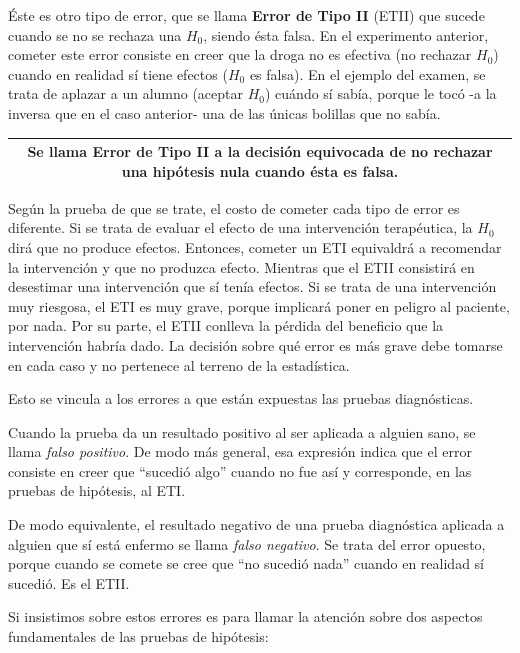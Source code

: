 \documentclass[]{book}
\begin{document}
Éste es otro tipo de error, que se llama \textbf{Error de Tipo II} (ETII) que
sucede cuando se no se rechaza una \(H_{0}\), siendo ésta falsa. En el experimento
anterior, cometer este error consiste en creer que la droga no es
efectiva (no rechazar \(H_{0}\)) cuando en realidad sí tiene efectos (\(H_{0}\) es
falsa). En el ejemplo del examen, se trata de aplazar a un alumno
(aceptar \(H_{0}\)) cuándo sí sabía, porque le tocó -a la inversa que en el
caso anterior- una de las únicas bolillas que no sabía.

\begin{longtable}[]{@{}c@{}}
\toprule
\endhead
\begin{minipage}[t]{0.97\columnwidth}\centering
Se llama \textbf{Error de Tipo II} a la decisión equivocada de no rechazar una hipótesis nula cuando ésta es falsa.\strut
\end{minipage}\tabularnewline
\bottomrule
\end{longtable}

Según la prueba de que se trate, el costo de cometer cada tipo de error
es diferente. Si se trata de evaluar el efecto de una intervención
terapéutica, la \(H_{0}\) dirá que no produce efectos. Entonces, cometer un
ETI equivaldrá a recomendar la intervención y que no produzca efecto.
Mientras que el ETII consistirá en desestimar una intervención que sí
tenía efectos. Si se trata de una intervención muy riesgosa, el ETI es
muy grave, porque implicará poner en peligro al paciente, por nada. Por
su parte, el ETII conlleva la pérdida del beneficio que la intervención
habría dado. La decisión sobre qué error es más grave debe tomarse en
cada caso y no pertenece al terreno de la estadística.

Esto se vincula a los errores a que están expuestas las pruebas
diagnósticas.

Cuando la prueba da un resultado positivo al ser aplicada a alguien
sano, se llama \emph{falso positivo}. De modo más general, esa expresión
indica que el error consiste en creer que ``sucedió algo'' cuando no fue
así y corresponde, en las pruebas de hipótesis, al ETI.

De modo equivalente, el resultado negativo de una prueba diagnóstica
aplicada a alguien que sí está enfermo se llama \emph{falso negativo}. Se
trata del error opuesto, porque cuando se comete se cree que ``no sucedió nada'' cuando en realidad sí sucedió. Es el ETII.

Si insistimos sobre estos errores es para llamar la atención sobre dos
aspectos fundamentales de las pruebas de hipótesis:
\end{document}

